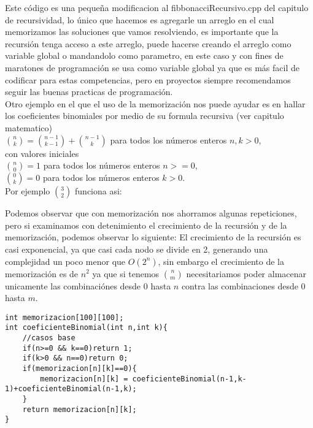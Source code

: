 Este código es una pequeña modificacion al fibbonacciRecursivo.cpp del capitulo de recursividad, lo único que hacemos es agregarle un arreglo en el cual memorizamos las soluciones que vamos resolviendo, es importante que la recursión tenga acceso a este arreglo, puede hacerse creando el arreglo como variable global o mandandolo como parametro, en este caso y con fines de maratones de programación se usa como variable global ya que es más facil de codificar para estas competencias, pero en proyectos siempre recomendamos seguir las buenas practicas de programación.
\\Otro ejemplo en el que el uso de la memorización nos puede ayudar es en hallar los coeficientes binomiales por medio de su formula recursiva (ver capitulo matematico)
\\${n \choose k} = {n-1 \choose k-1} + {n-1 \choose k}$ para todos los números enteros $n,k > 0$,
\\con valores iniciales
\\${n \choose 0}=1$ para todos los números enteros $n>=0$,
\\${0 \choose k}=0$ para todos los números enteros $k>0$.
\\Por ejemplo ${3 \choose 2}$ funciona asi:
\\

Podemos observar que con memorización nos ahorramos algunas repeticiones, pero si examinamos con detenimiento el crecimiento de la recursión y de la memorización, podemos observar lo siguiente:
El crecimiento de la recursión es casi exponencial, ya que casi cada nodo se divide en 2, generando una complejidad un poco menor que $O(2^n)$, sin embargo el crecimiento de la memorización es de $n^2$ ya que si tenemos ${n \choose m}$ necesitariamos poder almacenar unicamente las combinaciónes desde $0$ hasta $n$ contra las combinaciones desde $0$ hasta $m$.

\begin{minipage}{\textwidth}
\begin{lstlisting}[style=C,caption=coeficientesBinomiales.cpp]
int memorizacion[100][100];
int coeficienteBinomial(int n,int k){
    //casos base
    if(n>=0 && k==0)return 1;
    if(k>0 && n==0)return 0;
    if(memorizacion[n][k]==0){
        memorizacion[n][k] = coeficienteBinomial(n-1,k-1)+coeficienteBinomial(n-1,k);
    }
    return memorizacion[n][k];
}
\end{lstlisting}
\end{minipage}

